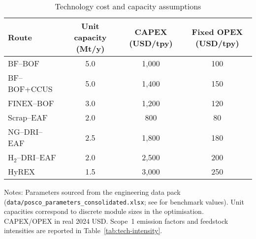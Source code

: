 \begin{table}[ht]
  \centering
  \caption{Technology cost and capacity assumptions}
  \label{tab:tech-costs}
  \begin{threeparttable}
  \begin{tabular}{@{}lccc@{}}
    \toprule
    Route & Unit capacity (Mt/y) & CAPEX (USD/tpy) & Fixed OPEX (USD/tpy) \\
    \midrule
    BF--BOF & 5.0 & 1{,}000 & 100 \\
    BF--BOF+CCUS & 5.0 & 1{,}400 & 150 \\
    FINEX--BOF & 3.0 & 1{,}200 & 120 \\
    Scrap--EAF & 2.0 & 800 & 80 \\
    NG--DRI--EAF & 2.5 & 1{,}800 & 180 \\
    H$_2$--DRI--EAF & 2.0 & 2{,}500 & 200 \\
    HyREX & 1.5 & 3{,}000 & 250 \\
    \bottomrule
  \end{tabular}
  \begin{tablenotes}
    \footnotesize
    \item Notes: Parameters sourced from the engineering data pack (\texttt{data/posco\_parameters\_consolidated.xlsx}; see \citet{MaterialEconomics2019,prammer2021steel,kuramochi2018beyond} for benchmark values). Unit capacities correspond to discrete module sizes in the optimisation. CAPEX/OPEX in real 2024 USD. Scope~1 emission factors and feedstock intensities are reported in Table~\ref{tab:tech-intensity}.
  \end{tablenotes}
  \end{threeparttable}
\end{table}
